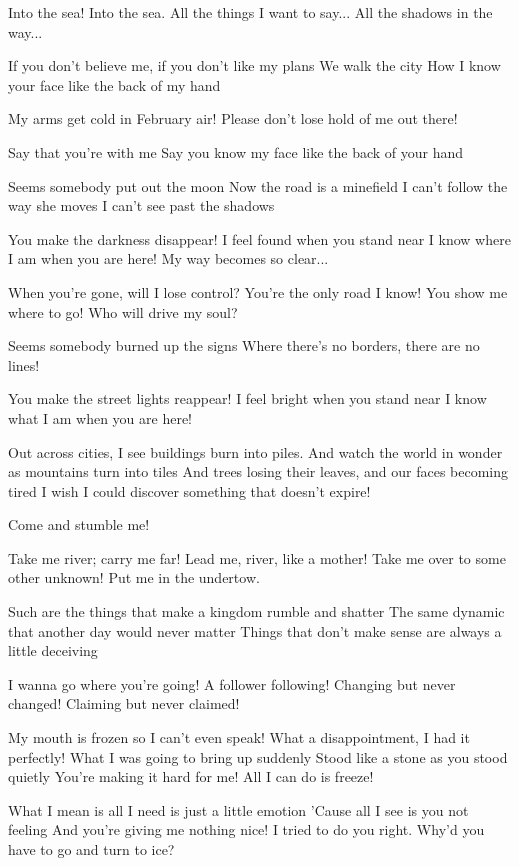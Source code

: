 Into the sea! Into the sea.
All the things I want to say...
All the shadows in the way...


If you don't believe me, if you don't like my plans
We walk the city
How I know your face like the back of my hand

My arms get cold in February air!
Please don't lose hold of me out there!

Say that you're with me
Say you know my face like the back of your hand


Seems somebody put out the moon
Now the road is a minefield
I can't follow the way she moves
I can't see past the shadows

You make the darkness disappear!
I feel found when you stand near
I know where I am when you are here!
My way becomes so clear...

When you're gone, will I lose control?
You're the only road I know!
You show me where to go!
Who will drive my soul?

Seems somebody burned up the signs
Where there's no borders, there are no lines!

You make the street lights reappear!
I feel bright when you stand near
I know what I am when you are here!


Out across cities, I see buildings burn into piles.
And watch the world in wonder as mountains turn into tiles
And trees losing their leaves, and our faces becoming tired
I wish I could discover something that doesn't expire!

Come and stumble me!

Take me river; carry me far!
Lead me, river, like a mother!
Take me over to some other unknown!
Put me in the undertow.

Such are the things that make a kingdom rumble and shatter
The same dynamic that another day would never matter
Things that don't make sense are always a little deceiving

I wanna go where you're going!
A follower following!
Changing but never changed!
Claiming but never claimed!


My mouth is frozen so I can't even speak!
What a disappointment, I had it perfectly!
What I was going to bring up suddenly
Stood like a stone as you stood quietly
You're making it hard for me! All I can do is freeze!

What I mean is all I need is just a little emotion
'Cause all I see is you not feeling
And you're giving me nothing nice!
I tried to do you right. Why'd you have to go and turn to ice?

